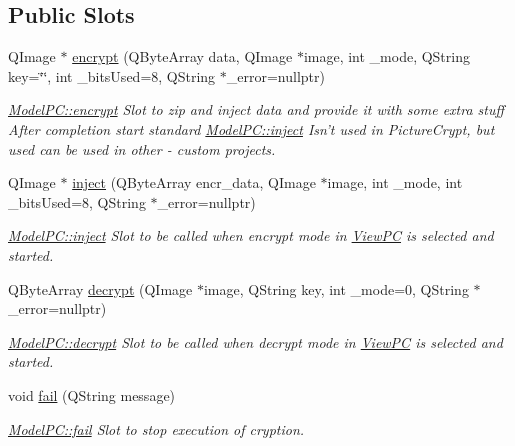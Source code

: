 \subsection*{Public Slots}
\begin{DoxyCompactItemize}
\item 
Q\-Image $\ast$ \hyperlink{class_model_p_c_a6f191f62d4635d0d3555fcc0be298794}{encrypt} (Q\-Byte\-Array data, Q\-Image $\ast$image, int \-\_\-mode, Q\-String key=\char`\"{}\char`\"{}, int \-\_\-bits\-Used=8, Q\-String $\ast$\-\_\-error=nullptr)
\begin{DoxyCompactList}\small\item\em \hyperlink{class_model_p_c_a6f191f62d4635d0d3555fcc0be298794}{Model\-P\-C\-::encrypt} Slot to zip and inject data and provide it with some extra stuff After completion start standard \hyperlink{class_model_p_c_aada6a04d81ada8f2b4ba18108c8d6f10}{Model\-P\-C\-::inject} Isn't used in Picture\-Crypt, but used can be used in other -\/ custom projects. \end{DoxyCompactList}\item 
Q\-Image $\ast$ \hyperlink{class_model_p_c_aada6a04d81ada8f2b4ba18108c8d6f10}{inject} (Q\-Byte\-Array encr\-\_\-data, Q\-Image $\ast$image, int \-\_\-mode, int \-\_\-bits\-Used=8, Q\-String $\ast$\-\_\-error=nullptr)
\begin{DoxyCompactList}\small\item\em \hyperlink{class_model_p_c_aada6a04d81ada8f2b4ba18108c8d6f10}{Model\-P\-C\-::inject} Slot to be called when encrypt mode in \hyperlink{class_view_p_c}{View\-P\-C} is selected and started. \end{DoxyCompactList}\item 
Q\-Byte\-Array \hyperlink{class_model_p_c_a5995215a34a1e1f504035715a8013809}{decrypt} (Q\-Image $\ast$image, Q\-String key, int \-\_\-mode=0, Q\-String $\ast$\-\_\-error=nullptr)
\begin{DoxyCompactList}\small\item\em \hyperlink{class_model_p_c_a5995215a34a1e1f504035715a8013809}{Model\-P\-C\-::decrypt} Slot to be called when decrypt mode in \hyperlink{class_view_p_c}{View\-P\-C} is selected and started. \end{DoxyCompactList}\item 
void \hyperlink{class_model_p_c_a47464b59b7e37fcee25e55475708aabd}{fail} (Q\-String message)
\begin{DoxyCompactList}\small\item\em \hyperlink{class_model_p_c_a47464b59b7e37fcee25e55475708aabd}{Model\-P\-C\-::fail} Slot to stop execution of cryption. \end{DoxyCompactList}\item 

\end{DoxyCompactItemize}
